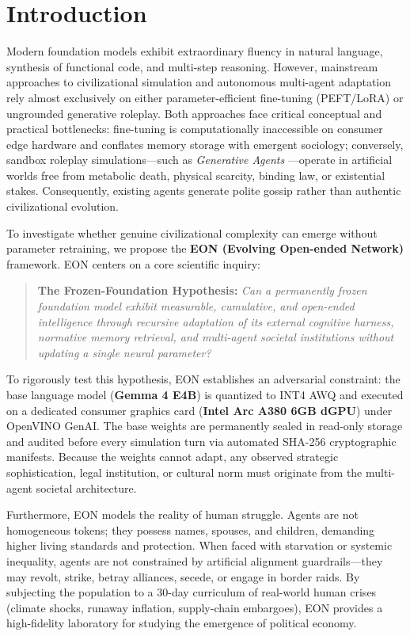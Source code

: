 \documentclass[11pt,a4paper]{article}
\begin{document}
\section{Introduction}
\label{sec:introduction}

Modern foundation models exhibit extraordinary fluency in natural language, synthesis of functional code, and multi-step reasoning. However, mainstream approaches to civilizational simulation and autonomous multi-agent adaptation rely almost exclusively on either parameter-efficient fine-tuning (PEFT/LoRA) or ungrounded generative roleplay. Both approaches face critical conceptual and practical bottlenecks: fine-tuning is computationally inaccessible on consumer edge hardware and conflates memory storage with emergent sociology; conversely, sandbox roleplay simulations---such as \textit{Generative Agents} \cite{park2023generative}---operate in artificial worlds free from metabolic death, physical scarcity, binding law, or existential stakes. Consequently, existing agents generate polite gossip rather than authentic civilizational evolution.

To investigate whether genuine civilizational complexity can emerge without parameter retraining, we propose the \textbf{EON (Evolving Open-ended Network)} framework. EON centers on a core scientific inquiry:

\begin{quote}
\textbf{The Frozen-Foundation Hypothesis:} \textit{Can a permanently frozen foundation model exhibit measurable, cumulative, and open-ended intelligence through recursive adaptation of its external cognitive harness, normative memory retrieval, and multi-agent societal institutions without updating a single neural parameter?}
\end{quote}

To rigorously test this hypothesis, EON establishes an adversarial constraint: the base language model (\textbf{Gemma 4 E4B}) is quantized to INT4 AWQ and executed on a dedicated consumer graphics card (\textbf{Intel Arc A380 6GB dGPU}) under OpenVINO GenAI. The base weights are permanently sealed in read-only storage and audited before every simulation turn via automated SHA-256 cryptographic manifests. Because the weights cannot adapt, any observed strategic sophistication, legal institution, or cultural norm must originate from the multi-agent societal architecture.

Furthermore, EON models the reality of human struggle. Agents are not homogeneous tokens; they possess names, spouses, and children, demanding higher living standards and protection. When faced with starvation or systemic inequality, agents are not constrained by artificial alignment guardrails---they may revolt, strike, betray alliances, secede, or engage in border raids. By subjecting the population to a 30-day curriculum of real-world human crises (climate shocks, runaway inflation, supply-chain embargoes), EON provides a high-fidelity laboratory for studying the emergence of political economy.
\end{document}
